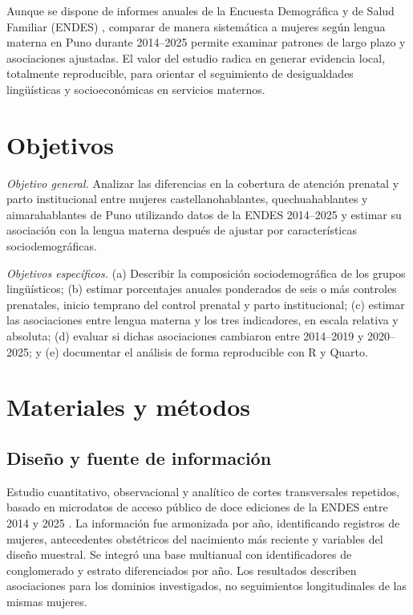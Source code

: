 \documentclass[
  spanish,
  letterpaper,
  conference]{IEEEtran}
\begin{document}
Aunque se dispone de informes anuales de la Encuesta Demográfica y de
Salud Familiar (ENDES) \citep{inei2024, inei2025}, comparar de manera
sistemática a mujeres según lengua materna en Puno durante 2014--2025
permite examinar patrones de largo plazo y asociaciones ajustadas. El
valor del estudio radica en generar evidencia local, totalmente
reproducible, para orientar el seguimiento de desigualdades lingüísticas
y socioeconómicas en servicios maternos.

\section{Objetivos}\label{objetivos}

\emph{Objetivo general.} Analizar las diferencias en la cobertura de
atención prenatal y parto institucional entre mujeres
castellanohablantes, quechuahablantes y aimarahablantes de Puno
utilizando datos de la ENDES 2014--2025 y estimar su asociación con la
lengua materna después de ajustar por características sociodemográficas.

\emph{Objetivos específicos.} (a) Describir la composición
sociodemográfica de los grupos lingüísticos; (b) estimar porcentajes
anuales ponderados de seis o más controles prenatales, inicio temprano
del control prenatal y parto institucional; (c) estimar las asociaciones
entre lengua materna y los tres indicadores, en escala relativa y
absoluta; (d) evaluar si dichas asociaciones cambiaron entre 2014--2019
y 2020--2025; y (e) documentar el análisis de forma reproducible con R y
Quarto.

\section{Materiales y métodos}\label{materiales-y-muxe9todos}

\subsection{Diseño y fuente de
información}\label{diseuxf1o-y-fuente-de-informaciuxf3n}

Estudio cuantitativo, observacional y analítico de cortes transversales
repetidos, basado en microdatos de acceso público de doce ediciones de
la ENDES entre 2014 y 2025 \citep{inei2024, inei2025}. La información
fue armonizada por año, identificando registros de mujeres, antecedentes
obstétricos del nacimiento más reciente y variables del diseño muestral.
Se integró una base multianual con identificadores de conglomerado y
estrato diferenciados por año. Los resultados describen asociaciones
para los dominios investigados, no seguimientos longitudinales de las
mismas mujeres.
\end{document}
